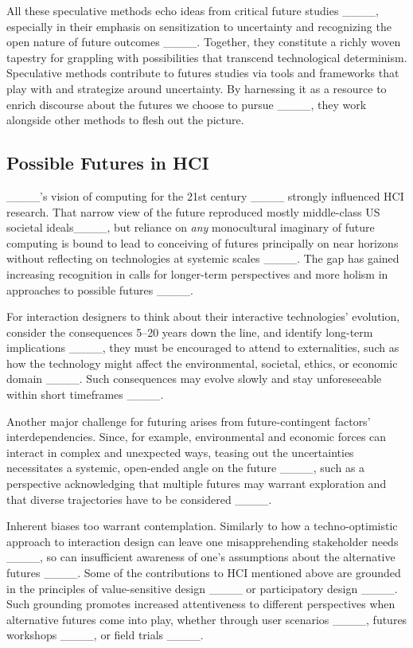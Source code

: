 All these speculative methods echo ideas from critical future studies ____, especially in their emphasis on sensitization to uncertainty 
and recognizing 
the open nature of future outcomes ____. Together, they constitute a richly woven tapestry for grappling with possibilities that transcend technological determinism. Speculative methods contribute to futures studies via tools and frameworks that play with and strategize around uncertainty. By harnessing it as a resource to enrich discourse about the futures we choose to pursue ____, they work alongside other methods to flesh out the picture. 

\subsection{Possible Futures in HCI} \label{sec:possible-futures-HCI}

____’s vision of computing for the 21st century ____ strongly influenced HCI research. That narrow view of the future reproduced mostly middle-class US societal ideals____, 
but reliance on \emph{any} monocultural imaginary of future computing is bound to lead to conceiving of futures principally on near horizons without reflecting on technologies at systemic scales ____. 
The gap has gained increasing recognition in calls for longer-term perspectives and more holism in approaches to possible futures ____.

For interaction designers to think about their interactive technologies' evolution, consider the consequences 5--20 years down the line, and identify long-term implications ____, they must be encouraged to attend to externalities, such as how the technology might affect the environmental, societal, ethics, or economic domain ____. Such consequences may evolve slowly and stay unforeseeable within short timeframes ____.

Another major challenge for futuring arises from future-contin\-gent factors' interdependencies. 
Since, for example, environmental and economic forces can interact in complex and
unexpected ways, teasing out the uncertainties necessitates a systemic, open-ended angle on the future 
____, such as a perspective acknowledging that multiple futures may warrant exploration and that diverse trajectories have to be considered ____.

Inherent biases too warrant contemplation. Similarly to how a techno-optimistic approach to interaction design can leave one misapprehending stakeholder needs ____, so can insufficient awareness of one's assumptions about the alternative futures ____. Some of the contributions to HCI mentioned above are grounded in the principles of value-sensitive design ____ or participatory design ____.
Such grounding promotes increased attentiveness to different perspectives when alternative futures come into play, whether through user scenarios ____, futures workshops ____, or field trials ____.  

